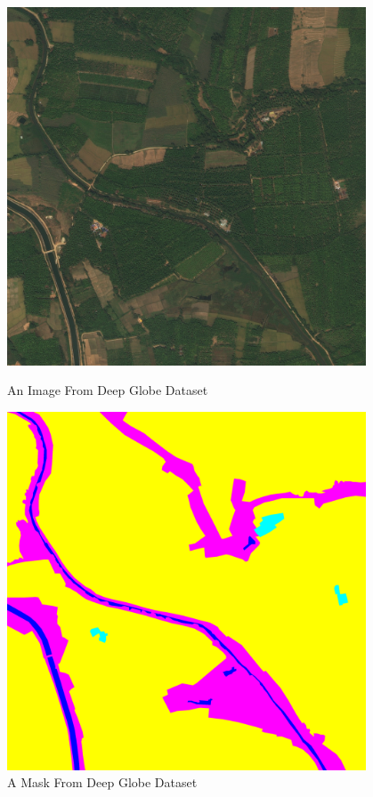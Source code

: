 \FloatBarrier
\begin{figure}[!htb]
    \centering
    \begin{minipage}{0.5\textwidth}
        \centering
        \includegraphics[width=0.95\textwidth, height=0.35\textheight]{images/deepglobe_img.jpg}
        \caption{An Image From Deep Globe Dataset \protect\cite{deep-globe}}
        \label{fig:deep-globe-image}
    \end{minipage}\hfill
    \begin{minipage}{0.5\textwidth}
        \centering
        \includegraphics[width=0.95\textwidth, height=0.35\textheight]{images/deepglobe_mask.png}
\centering
\caption{A Mask From Deep Globe Dataset \protect\cite{deep-globe}}
\label{fig:deep-globe-mask}
    \end{minipage}
\end{figure}
\FloatBarrier



